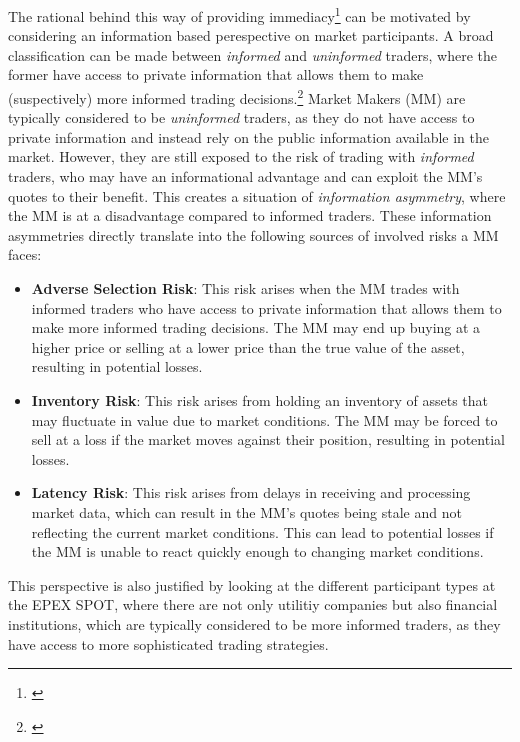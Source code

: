 \documentclass[12pt,a4paper]{cau_thesis}
\begin{document}
The rational behind this way of providing
immediacy\footnote{\cite[See ][, p.]{demsetz1968cost}} can be
motivated by considering an information based perespective on market
participants. A broad classification can be made between
\textit{informed} and \textit{uninformed} traders, where the former
have access to private information that allows them to make
(suspectively) more informed trading decisions.\footnote{\cite[See
    ][, p.30]{cartea2015algorithmic}} Market Makers (MM) are typically
considered to be \textit{uninformed} traders, as they do not have
access to private information and instead rely on the public
information available in the market. However, they are still exposed
to the risk of trading with \textit{informed} traders, who may have
an informational advantage and can exploit the MM's quotes to their
benefit. This creates a situation of \textit{information asymmetry},
where the MM is at a disadvantage compared to informed traders. These
information asymmetries directly translate into the following sources
of involved risks a MM faces:
\begin{itemize}
    \item \textbf{Adverse Selection Risk}: This risk arises when the MM trades with informed traders who have access to private information that allows them to make more informed trading decisions. The MM may end up buying at a higher price or selling at a lower price than the true value of the asset, resulting in potential losses.
    \item \textbf{Inventory Risk}: This risk arises from holding an inventory of assets that may fluctuate in value due to market conditions. The MM may be forced to sell at a loss if the market moves against their position, resulting in potential losses.
    \item \textbf{Latency Risk}: This risk arises from delays in receiving and processing market data, which can result in the MM's quotes being stale and not reflecting the current market conditions. This can lead to potential losses if the MM is unable to react quickly enough to changing market conditions.
\end{itemize}

This perspective is also justified by looking at the different
participant types at the EPEX SPOT, where there are not only utilitiy
companies but also financial institutions, which are typically
considered to be more informed traders, as they have access to more
sophisticated trading strategies.
\end{document}

